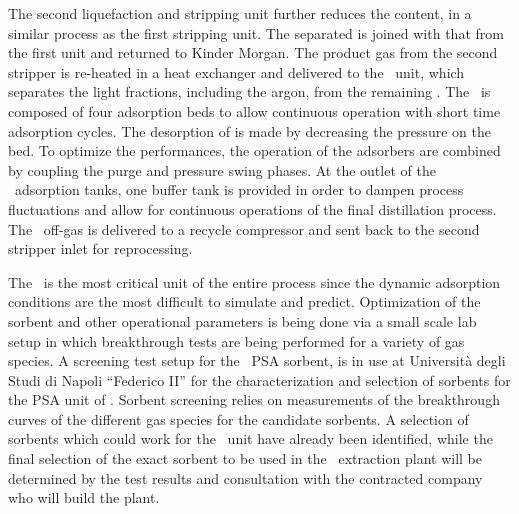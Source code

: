 The second liquefaction and stripping unit further reduces the  content, in a similar process as the first stripping unit. The separated  is joined with that from the first unit and returned to Kinder Morgan.  The product gas from the second stripper is re-heated in a heat exchanger and delivered to the \PSA\ unit, which separates the light fractions, including the argon, from the remaining .   The \PSA\ is composed of four adsorption beds to allow continuous operation with short time adsorption cycles.  The desorption of  is made by decreasing the pressure on the bed.  To optimize the performances, the operation of the adsorbers are combined by coupling the purge and pressure swing phases.  At the outlet of the \PSA\ adsorption tanks, one buffer tank is provided in order to dampen process fluctuations and allow for continuous operations of the final distillation process.  The \PSA\ off-gas is delivered to a recycle compressor and sent back to the second  stripper inlet for reprocessing.  

The \PSA\ is the most critical unit of the entire process since the dynamic adsorption conditions are the most difficult to simulate and predict.  Optimization of the sorbent and other operational parameters is being done via a small scale lab setup in which breakthrough tests are being performed for a variety of gas species. A screening test setup for the \Urania\ PSA sorbent, is in use at Universit\`a degli Studi di Napoli ``Federico II'' for the characterization and selection of sorbents for the PSA unit of \Urania. Sorbent screening relies on measurements of the breakthrough curves of the different gas species for the candidate sorbents.  A selection of sorbents which could work for the \PSA\ unit have already been identified, while the final selection of the exact sorbent to be used in the \UAr\ extraction plant will be determined by the test results and consultation with the contracted company who will build the plant.


